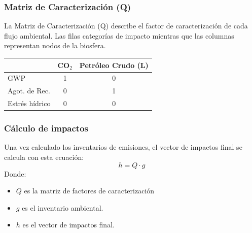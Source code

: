 \documentclass{beamer}
\begin{document}
\begin{frame}
  \frametitle{Matriz de Caracterización (Q)}
  La Matriz de Caracterización (Q) describe el factor de caracterización de cada flujo ambiental. Las filas categorías de impacto mientras que las columnas representan nodos de la biosfera.
  \begin{center}
  \begin{tabular}{l|cc}
  \toprule
   & CO$_2$ & Petróleo Crudo (L) \\
  \midrule
  GWP & 1 & 0 \\
  Agot. de Rec. & 0 & 1 \\
  Estrés hídrico & 0 & 0 \\
  \bottomrule
  \end{tabular}
  \end{center}
\end{frame}

\begin{frame}
  \frametitle{Cálculo de impactos}
  Una vez calculado los inventarios de emisiones, el vector de impactos final se calcula con esta ecuación:
  \begin{equation*}
    h = Q \cdot g
  \end{equation*}
  Donde:
  \begin{itemize}
    \item $Q$ es la matriz de factores de caracterización
    \item $g$ es el inventario ambiental.
    \item $h$ es el vector de impactos final.
  \end{itemize}
\end{frame}
\end{document}

